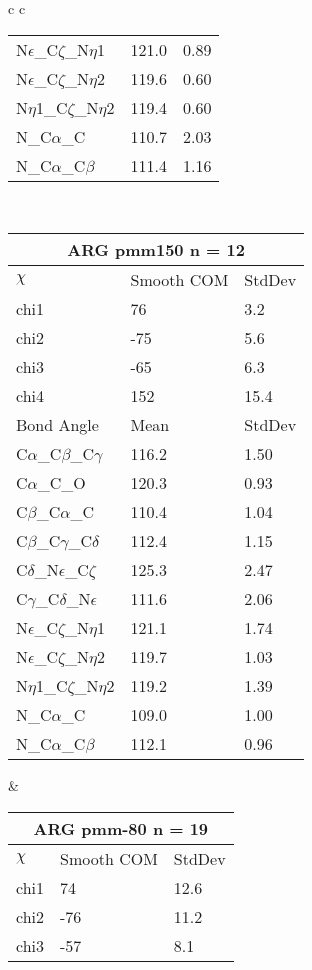 \begin{longtable}{ c c }
\begin{tabular}{ l l l }
  N$\epsilon$\_C$\zeta$\_N$\eta$1 & 121.0 & 0.89\\
  N$\epsilon$\_C$\zeta$\_N$\eta$2 & 119.6 & 0.60\\
  N$\eta$1\_C$\zeta$\_N$\eta$2 & 119.4 & 0.60\\
  N\_C$\alpha$\_C & 110.7 & 2.03\\
  N\_C$\alpha$\_C$\beta$ & 111.4 & 1.16\\
  \bottomrule
  \end{tabular}
  \\
  \begin{tabular}{ l l l }
  \toprule
  \multicolumn{3}{c}{ARG \textbf{pmm150} n = 12} \\ \toprule
  $\chi$       & Smooth COM & StdDev \\ \midrule
  chi1 & 76 & 3.2 \\ 
  chi2 & -75 & 5.6 \\ 
  chi3 & -65 & 6.3 \\ 
  chi4 & 152 & 15.4 \\ \midrule
  Bond Angle   & Mean     & StdDev \\ \midrule
  C$\alpha$\_C$\beta$\_C$\gamma$ & 116.2 & 1.50\\
  C$\alpha$\_C\_O & 120.3 & 0.93\\
  C$\beta$\_C$\alpha$\_C & 110.4 & 1.04\\
  C$\beta$\_C$\gamma$\_C$\delta$ & 112.4 & 1.15\\
  C$\delta$\_N$\epsilon$\_C$\zeta$ & 125.3 & 2.47\\
  C$\gamma$\_C$\delta$\_N$\epsilon$ & 111.6 & 2.06\\
  N$\epsilon$\_C$\zeta$\_N$\eta$1 & 121.1 & 1.74\\
  N$\epsilon$\_C$\zeta$\_N$\eta$2 & 119.7 & 1.03\\
  N$\eta$1\_C$\zeta$\_N$\eta$2 & 119.2 & 1.39\\
  N\_C$\alpha$\_C & 109.0 & 1.00\\
  N\_C$\alpha$\_C$\beta$ & 112.1 & 0.96\\
  \bottomrule
  \end{tabular}
  &
  \begin{tabular}{ l l l }
  \toprule
  \multicolumn{3}{c}{ARG \textbf{pmm-80} n = 19} \\ \toprule
  $\chi$       & Smooth COM & StdDev \\ \midrule
  chi1 & 74 & 12.6 \\ 
  chi2 & -76 & 11.2 \\ 
  chi3 & -57 & 8.1 \\ 

\end{tabular}
\end{longtable}

